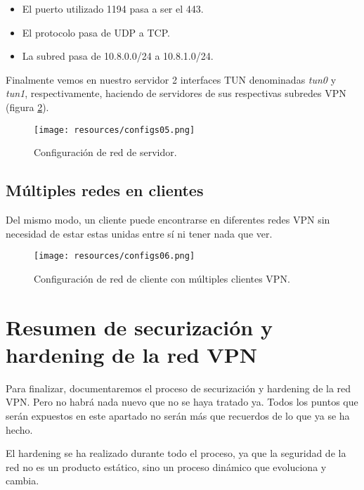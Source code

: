 \documentclass[a4paper, 11pt, titlepage]{article}
\begin{document}
        \begin{itemize}
            \item El puerto utilizado 1194 pasa a ser el 443.
            \item El protocolo pasa de UDP a TCP.
            \item La subred pasa de 10.8.0.0/24 a 10.8.1.0/24.
        \end{itemize}

        Finalmente vemos en nuestro servidor 2 interfaces TUN denominadas \textit{tun0} y \textit{tun1},
        respectivamente, haciendo de servidores de sus respectivas subredes VPN (figura \ref{fig:configs05}).

        \begin{figure}[htp]
            \centering
            \texttt{[image: resources/configs05.png]}
            \caption{Configuración de red de servidor.}
            \label{fig:configs05}
        \end{figure} 

        \newpage
    \subsection{Múltiples redes en clientes}

        Del mismo modo, un cliente puede encontrarse en diferentes redes VPN sin necesidad de estar
        estas unidas entre sí ni tener nada que ver. 

        \begin{figure}[htp]
            \centering
            \texttt{[image: resources/configs06.png]}
            \caption{Configuración de red de cliente con múltiples clientes VPN.}
            \label{fig:configs05}
        \end{figure} 

\section{Resumen de securización y hardening de la red VPN}

    Para finalizar, documentaremos el proceso de securización y hardening de la red VPN. Pero
    no habrá nada nuevo que no se haya tratado ya. Todos los puntos que serán expuestos en este 
    apartado no serán más que recuerdos de lo que ya se ha hecho. 

    El hardening se ha realizado durante todo el proceso, ya que la seguridad de la red no es 
    un producto estático, sino un proceso dinámico que evoluciona y cambia.
\end{document}
